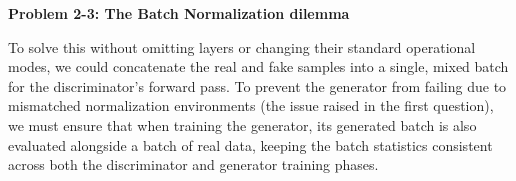 \documentclass{article}
\begin{document}
\vspace{1.5em}

\textbf{Problem 2-3: The Batch Normalization dilemma}

To solve this without omitting layers or changing their standard operational modes, we could concatenate the real and fake samples into a single, mixed batch for the discriminator's forward pass. To prevent the generator from failing due to mismatched normalization environments (the issue raised in the first question), we must ensure that when training the generator, its generated batch is also evaluated alongside a batch of real data, keeping the batch statistics consistent across both the discriminator and generator training phases.
\end{document}
